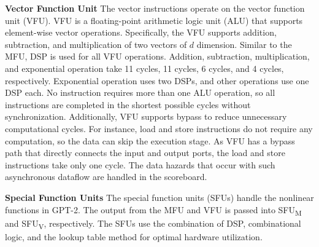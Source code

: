 
\textbf{Vector Function Unit}
The vector instructions operate on the vector function unit (VFU). VFU is a floating-point arithmetic logic unit (ALU) that supports element-wise vector operations. Specifically, the VFU supports addition, subtraction, and multiplication of two vectors of $d$ dimension. 
Similar to the MFU, DSP is used for all VFU operations. Addition, subtraction, multiplication, and exponential operation take 11 cycles, 11 cycles, 6 cycles, and 4 cycles, respectively. Exponential operation uses two DSPs, and other operations use one DSP each. No instruction requires more than one ALU operation, so all instructions are completed in the shortest possible cycles without synchronization. Additionally, VFU supports bypass to reduce unnecessary computational cycles. For instance, load and store instructions do not require any computation, so the data can skip the execution stage. As VFU has a bypass path that directly connects the input and output ports, the load and store instructions take only one cycle. The data hazards that occur with such asynchronous dataflow are handled in the scoreboard.



\textbf{Special Function Units}
The special function units (SFUs) handle the nonlinear functions in GPT-2. The output from the MFU and VFU is passed into SFU\textsubscript{M} and SFU\textsubscript{V}, respectively. The SFUs use the combination of DSP, combinational logic, and the lookup table method for optimal hardware utilization. 


